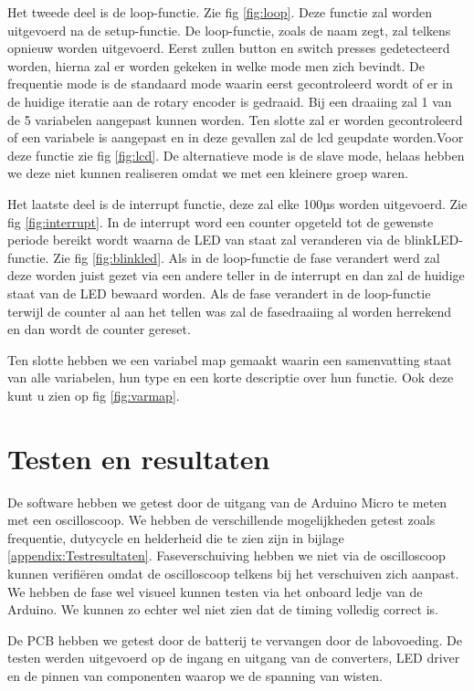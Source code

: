 \documentclass[a4paper,dutch]{article}
\begin{document}
Het tweede deel is de loop-functie. Zie fig \ref{fig:loop}. Deze functie zal worden uitgevoerd na de setup-functie. De loop-functie, zoals de naam zegt, zal telkens opnieuw worden uitgevoerd. Eerst zullen button en switch presses gedetecteerd worden, hierna zal er worden gekeken in welke mode men zich bevindt. De frequentie mode is de standaard mode waarin eerst gecontroleerd wordt of er in de huidige iteratie aan de rotary encoder is gedraaid. Bij een draaiing zal 1 van de 5 variabelen aangepast kunnen worden. Ten slotte zal er worden gecontroleerd of een variabele is aangepast en in deze gevallen zal de lcd geupdate worden.Voor deze functie zie fig \ref{fig:lcd}. De alternatieve mode is de slave mode, helaas hebben we deze niet kunnen realiseren omdat we met een kleinere groep waren.

Het laatste deel is de interrupt functie, deze zal elke 100µs worden uitgevoerd. Zie fig \ref{fig:interrupt}. In de interrupt word een counter opgeteld tot de gewenste periode bereikt wordt waarna de LED van staat zal veranderen via de blinkLED-functie. Zie fig \ref{fig:blinkled}. Als in de loop-functie de fase verandert werd zal deze worden juist gezet via een andere teller in de interrupt en dan zal de huidige staat van de LED bewaard worden. Als de fase verandert in de loop-functie terwijl de counter al aan het tellen was zal de fasedraaiing al worden herrekend en dan wordt de counter gereset.

Ten slotte hebben we een variabel map gemaakt waarin een samenvatting staat van alle variabelen, hun type en een korte descriptie over hun functie. Ook deze kunt u zien op fig \ref{fig:varmap}.

\section{Testen en resultaten}

De software hebben we getest door de uitgang van de Arduino Micro te meten met een oscilloscoop. We hebben de verschillende mogelijkheden getest zoals frequentie, dutycycle en helderheid die te zien zijn in bijlage \ref{appendix:Testresultaten}. Faseverschuiving hebben we niet via de oscilloscoop kunnen verifiëren omdat de oscilloscoop telkens bij het verschuiven zich aanpast. We hebben de fase wel visueel kunnen testen via het onboard ledje van de Arduino. We kunnen zo echter wel niet zien dat de timing volledig correct is. 

De PCB hebben we getest door de batterij te vervangen door de labovoeding. 
De testen werden uitgevoerd op de ingang en uitgang van de converters, LED driver en de pinnen van componenten waarop we de spanning van wisten.
\end{document}

